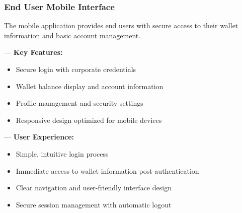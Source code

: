 \subsubsection{End User Mobile Interface}

The mobile application provides end users with secure access to their wallet information and basic account management.

— \textbf{Key Features:}
\begin{itemize}[nosep,leftmargin=*,label=•]
\item Secure login with corporate credentials
\item Wallet balance display and account information
\item Profile management and security settings
\item Responsive design optimized for mobile devices
\end{itemize}

— \textbf{User Experience:}
\begin{itemize}[nosep,leftmargin=*,label=•]
\item Simple, intuitive login process
\item Immediate access to wallet information post-authentication
\item Clear navigation and user-friendly interface design
\item Secure session management with automatic logout
\end{itemize}
